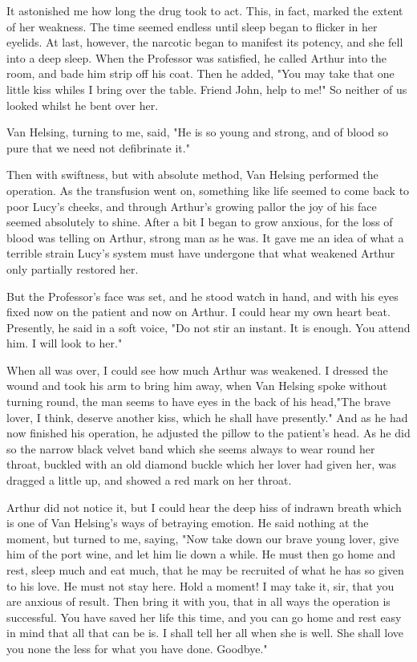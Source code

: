 It astonished me how long the drug took to act. This, in fact, marked the extent of her weakness. The time seemed endless until sleep began to flicker in her eyelids. At last, however, the narcotic began to manifest its potency, and she fell into a deep sleep. When the Professor was satisfied, he called Arthur into the room, and bade him strip off his coat. Then he added, "You may take that one little kiss whiles I bring over the table. Friend John, help to me!" So neither of us looked whilst he bent over her. 

Van Helsing, turning to me, said, "He is so young and strong, and of blood so pure that we need not defibrinate it." 

Then with swiftness, but with absolute method, Van Helsing performed the operation. As the transfusion went on, something like life seemed to come back to poor Lucy's cheeks, and through Arthur's growing pallor the joy of his face seemed absolutely to shine. After a bit I began to grow anxious, for the loss of blood was telling on Arthur, strong man as he was. It gave me an idea of what a terrible strain Lucy's system must have undergone that what weakened Arthur only partially restored her. 

But the Professor's face was set, and he stood watch in hand, and with his eyes fixed now on the patient and now on Arthur. I could hear my own heart beat. Presently, he said in a soft voice, "Do not stir an instant. It is enough. You attend him. I will look to her." 

When all was over, I could see how much Arthur was weakened. I dressed the wound and took his arm to bring him away, when Van Helsing spoke without turning round, the man seems to have eyes in the back of his head,"The brave lover, I think, deserve another kiss, which he shall have presently." And as he had now finished his operation, he adjusted the pillow to the patient's head. As he did so the narrow black velvet band which she seems always to wear round her throat, buckled with an old diamond buckle which her lover had given her, was dragged a little up, and showed a red mark on her throat. 

Arthur did not notice it, but I could hear the deep hiss of indrawn breath which is one of Van Helsing's ways of betraying emotion. He said nothing at the moment, but turned to me, saying, "Now take down our brave young lover, give him of the port wine, and let him lie down a while. He must then go home and rest, sleep much and eat much, that he may be recruited of what he has so given to his love. He must not stay here. Hold a moment! I may take it, sir, that you are anxious of result. Then bring it with you, that in all ways the operation is successful. You have saved her life this time, and you can go home and rest easy in mind that all that can be is. I shall tell her all when she is well. She shall love you none the less for what you have done. Goodbye." 

